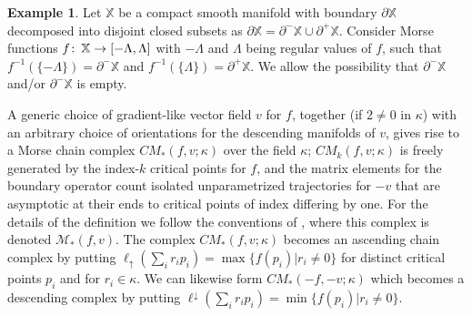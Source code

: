 \documentclass[11pt]{amsart}
\theoremstyle{definition}
\newtheorem{ex}[theorem]{Example}
\theoremstyle{remark}
\numberwithin{equation}{section}
\def\co{\colon\thinspace}
\begin{document}
\begin{ex}\label{morseex}
	Let $\mathbb{X}$ be a compact smooth manifold with boundary $\partial \mathbb{X}$ decomposed into disjoint closed subsets as $\partial \mathbb{X}=\partial^-\mathbb{X}\cup\partial^+\mathbb{X}$.  Consider Morse functions $f\co \mathbb{X}\to [-\Lambda,\Lambda]$ with $-\Lambda$ and $\Lambda$ being regular values of $f$, such that $f^{-1}(\{-\Lambda\})=\partial^-\mathbb{X}$ and $f^{-1}(\{\Lambda\})=\partial^+\mathbb{X}$.  We allow the possibility that $\partial^-\mathbb{X}$ and/or $\partial^-\mathbb{X}$ is empty.  

	A generic choice of gradient-like vector field $v$ for $f$, together (if $2\neq 0$ in $\kappa$) with an arbitrary choice of orientations for the descending manifolds of $v$, gives rise to a Morse chain complex $CM_*(f,v;\kappa)$ over the field $\kappa$; $CM_k(f,v;\kappa)$ is freely generated by the index-$k$ critical points for $f$, and the matrix elements for the boundary operator count isolated unparametrized trajectories for $-v$ that are asymptotic at their ends to critical points of index differing by one.  For the details of the definition we follow the conventions of \cite[Chapter 6]{Paj}, where this complex is denoted $\mathcal{M}_*(f,v)$.  The complex $CM_*(f,v;\kappa)$ becomes an ascending chain complex by putting $\ell_{\uparrow}\left(\sum_i r_ip_i\right)=\max\{f(p_i)|r_i\neq 0\}$ for distinct critical points $p_i$ and for $r_i\in \kappa$.  We can likewise form $CM_*(-f,-v;\kappa)$ which becomes a descending complex by putting $\ell^{\downarrow}\left(\sum_ir_ip_i\right)=\min \{f(p_i)|r_i\neq 0\}$.
	

\end{ex}
\end{document}
